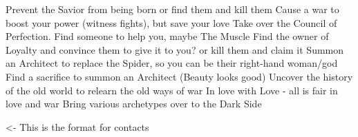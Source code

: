 \documentclass[char]{Silversiders}
\begin{document}
\name{\cWar{}}

Prevent the Savior from being born or find them and kill them
Cause a war to boost your power (witness fights), but save your love
Take over the Council of Perfection. Find someone to help you, maybe The Muscle
Find the owner of Loyalty and convince them to give it to you? or kill them and claim it
Summon an Architect to replace the Spider, so you can be their right-hand woman/god
Find a sacrifice to summon an Architect (Beauty looks good)
Uncover the history of the old world to relearn the old ways of war
In love with Love - all is fair in love and war
Bring various archetypes over to the Dark Side

\begin{itemz}[Goals]
	\item 
\end{itemz}

\begin{itemz}[Notes]
	\item 
\end{itemz}

\begin{contacts}
	\contact{\cTest{}} <- This is the format for contacts 
\end{contacts}
\end{document}

